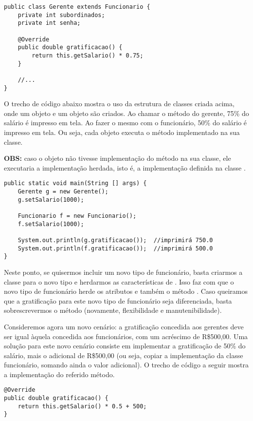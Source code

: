 \begin{verbatim}
public class Gerente extends Funcionario {
	private int subordinados;
	private int senha;

	@Override
	public double gratificacao() {
		return this.getSalario() * 0.75;
	}

	//...
}
\end{verbatim}
 
O trecho de código abaixo mostra o uso da estrutura de classes criada acima, onde um objeto  e um objeto  são criados. Ao chamar o método  do gerente, 75\% do salário é impresso em tela. Ao fazer o mesmo com o funcionário, 50\% do salário é impresso em tela. Ou seja, cada objeto executa o método implementado na sua classe.

\textbf{OBS:} caso o objeto não tivesse implementação do método na sua classe, ele executaria a implementação herdada, isto é, a implementação definida na classe .

\begin{verbatim}
public static void main(String [] args) {
	Gerente g = new Gerente();
	g.setSalario(1000);
	
	Funcionario f = new Funcionario();
	f.setSalario(1000);
	
	System.out.println(g.gratificacao());  //imprimirá 750.0
	System.out.println(f.gratificacao());  //imprimirá 500.0
}
\end{verbatim}
 
Neste ponto, se quisermos incluir um novo tipo de funcionário, basta criarmos a classe para o novo tipo e herdarmos as características de . Isso faz com que o novo tipo de funcionário herde os atributos e também o método . Caso queiramos que a gratificação para este novo tipo de funcionário seja diferenciada, basta sobrescrevermos o método  (novamente, flexibilidade e manutenibilidade).

Consideremos agora um novo cenário: a gratificação concedida aos gerentes deve ser igual àquela concedida aos funcionários, com um acréscimo de R\$500,00. Uma solução para este novo cenário consiste em implementar a gratificação de 50\% do salário, mais o adicional de R\$500,00 (ou seja, copiar a implementação da classe funcionário, somando ainda o valor adicional). O trecho de código a seguir mostra a implementação do referido método.

\begin{verbatim}
@Override
public double gratificacao() {
	return this.getSalario() * 0.5 + 500;
}
\end{verbatim}

